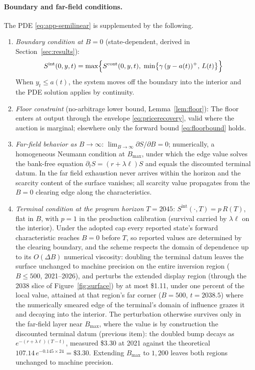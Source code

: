 \documentclass[11pt,letterpaper]{article}
\theoremstyle{plain}
\theoremstyle{definition}
\numberwithin{equation}{section}
\begin{document}
\paragraph{Boundary and far-field conditions.}
The PDE \eqref{eq:app-semilinear} is supplemented by the following.
\begin{enumerate}
  \item \emph{Boundary condition at $B=0$} (state-dependent, derived in Section~\ref{sec:results}):
   \begin{equation}\label{eq:app-bc}
S^{\mathrm{int}}(0,y,t) = \max\Bigl\{S^{\mathrm{cont}}(0,y,t),\; \min\bigl\{\gamma\,(y-a(t))^{+},\,L(t)\bigr\}\Bigr\}
   \end{equation}
    When $y_t\leq a(t)$, the system moves off the boundary into the interior and the PDE solution applies by continuity.

  \item \emph{Floor constraint} (no-arbitrage lower bound, Lemma~\ref{lem:floor}): The floor enters at output through the envelope \eqref{eq:pricerecovery}, valid where the auction is marginal; elsewhere only the forward bound \eqref{eq:floorbound} holds.

  \item \emph{Far-field behavior as $B\to\infty$}: $\lim_{B\to\infty}\partial S/\partial B=0$; numerically, a homogeneous Neumann condition at $B_{\max}$, under which the edge value solves the bank-free equation $\partial_t S=(r+\lambda\ell)S$ and equals the discounted terminal datum. In the far field exhaustion never arrives within the horizon and the scarcity content of the surface vanishes; all scarcity value propagates from the $B=0$ clearing edge along the characteristics.

  \item \emph{Terminal condition at the program horizon $T=2045$}: $S^{\mathrm{int}}(\cdot,T)=p\,R(T)$, flat in $B$, with $p=1$ in the production calibration (survival carried by $\lambda\ell$ on the interior). Under the adopted cap every reported state's forward characteristic reaches $B=0$ before $T$, so reported values are determined by the clearing boundary, and the scheme respects the domain of dependence up to its $O(\Delta B)$ numerical viscosity: doubling the terminal datum leaves the surface unchanged to machine precision on the entire inversion region ($B\le500$, 2021--2026), and perturbs the extended display region (through the 2038 slice of Figure~\ref{fig:surface}) by at most \$1.11, under one percent of the local value, attained at that region's far corner ($B=500$, $t=2038.5$) where the numerically smeared edge of the terminal's domain of influence grazes it and decaying into the interior. The perturbation otherwise survives only in the far-field layer near $B_{\max}$, where the value is by construction the discounted terminal datum (previous item): the doubled bump decays as $e^{-(r+\lambda\ell)(T-t)}$, measured \$3.30 at 2021 against the theoretical $107.14\,e^{-0.145\times24}=\$3.30$. Extending $B_{\max}$ to $1{,}200$ leaves both regions unchanged to machine precision.
\end{enumerate}
\end{document}
